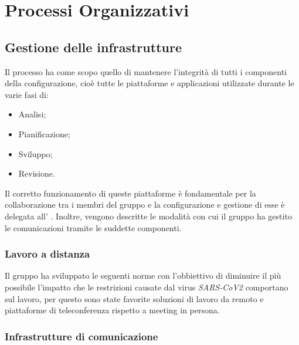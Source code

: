 \section{Processi Organizzativi}
\subsection{Gestione delle infrastrutture}

Il processo ha come scopo quello di mantenere l'integrità di tutti i componenti della configurazione, cioè tutte le piattaforme e applicazioni utilizzate durante le varie fasi di:
\begin{itemize}
\item Analisi;
\item Pianificazione;
\item Sviluppo;
\item Revisione.
\end{itemize}
Il corretto funzionamento di queste piattaforme è fondamentale per la collaborazione tra i membri del gruppo e la configurazione e gestione di esse è delegata all' \adm{}. Inoltre, vengono descritte le modalità con cui il gruppo ha gestito le comunicazioni tramite le suddette componenti.

\subsubsection{Lavoro a distanza}
Il gruppo ha sviluppato le seguenti norme con l'obbiettivo di diminuire il più possibile l'impatto che le restrizioni causate dal virus \textit{SARS-CoV2} comportano sul lavoro, per questo sono state favorite soluzioni di lavoro da remoto e piattaforme di teleconferenza rispetto a meeting in persona.

\subsubsection{Infrastrutture di comunicazione}

